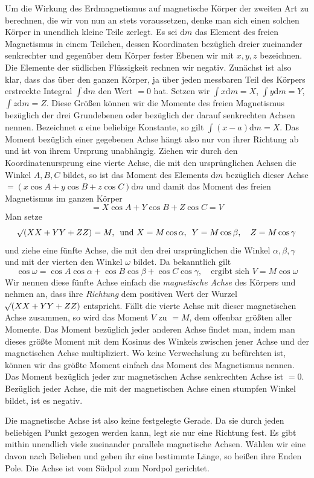 Um die Wirkung des Erdmagnetismus auf magnetische Körper der zweiten Art zu berechnen, die wir von nun an stets voraussetzen, denke man sich einen solchen Körper in unendlich kleine Teile zerlegt. Es sei $\mathrm{d}m$ das Element des freien Magnetismus in einem Teilchen, dessen Koordinaten bezüglich dreier zueinander senkrechter und gegenüber dem Körper fester Ebenen wir mit $x,y,z$ bezeichnen. Die Elemente der südlichen Flüssigkeit rechnen wir negativ. Zunächst ist also klar, dass das über den ganzen Körper, ja über jeden messbaren Teil des Körpers erstreckte Integral $\int\mathrm{d}m$ den Wert $=0$ hat. Setzen wir $\int x\mathrm{d}m=X$, $\int y\mathrm{d}m=Y$, $\int z\mathrm{d}m=Z$. Diese Größen können wir die Momente des freien Magnetismus bezüglich der drei Grundebenen oder bezüglich der darauf senkrechten Achsen nennen. Bezeichnet $a$ eine beliebige Konstante, so gilt $\int(x-a)\mathrm{d}m=X$. Das Moment bezüglich einer gegebenen Achse hängt also nur von ihrer Richtung ab und ist von ihrem Ursprung unabhängig. Ziehen wir durch den Koordinatenursprung eine vierte Achse, die mit den ursprünglichen Achsen die Winkel $A,B,C$ bildet, so ist das Moment des Elements $\mathrm{d}m$ bezüglich dieser Achse $=(x\cos A+y\cos B+z\cos C)\mathrm{d}m$ und damit das Moment des freien Magnetismus im ganzen Körper
\[
=X\cos A+Y\cos B+Z\cos C=V
\]
Man setze
\[
\mathord{{}^{}\!\surd}(XX+YY+ZZ)=M,\enspace\text{und }X=M\cos\alpha,\enspace Y=M\cos\beta,\quad Z=M\cos\gamma
\]
und ziehe eine fünfte Achse, die mit den drei ursprünglichen die Winkel $\alpha,\beta,\gamma$ und mit der vierten den Winkel $\omega$ bildet. Da bekanntlich gilt
\[
\cos\omega=\cos A\cos\alpha+\cos B\cos\beta+\cos C\cos\gamma,\quad\text{ergibt sich }V=M\cos\omega
\]
Wir nennen diese fünfte Achse einfach die \textit{magnetische Achse} des Körpers und nehmen an, dass ihre \textit{Richtung} dem positiven Wert der Wurzel $\mathord{{}^{}\!\surd}(XX+YY+ZZ)$ entspricht. Fällt die vierte Achse mit dieser magnetischen Achse zusammen, so wird das Moment $V$ zu $=M$, dem offenbar größten aller Momente. Das Moment bezüglich jeder anderen Achse findet man, indem man dieses größte Moment mit dem Kosinus des Winkels zwischen jener Achse und der magnetischen Achse multipliziert. Wo keine Verwechslung zu befürchten ist, können wir das größte Moment einfach das Moment des Magnetismus nennen. Das Moment bezüglich jeder zur magnetischen Achse senkrechten Achse ist $=0$. Bezüglich jeder Achse, die mit der magnetischen Achse einen stumpfen Winkel bildet, ist es negativ.

Die magnetische Achse ist also keine festgelegte Gerade. Da sie durch jeden beliebigen Punkt gezogen werden kann, legt sie nur eine Richtung fest. Es gibt mithin unendlich viele zueinander parallele magnetische Achsen. Wählen wir eine davon nach Belieben und geben ihr eine bestimmte Länge, so heißen ihre Enden Pole. Die Achse ist vom Südpol zum Nordpol gerichtet.

